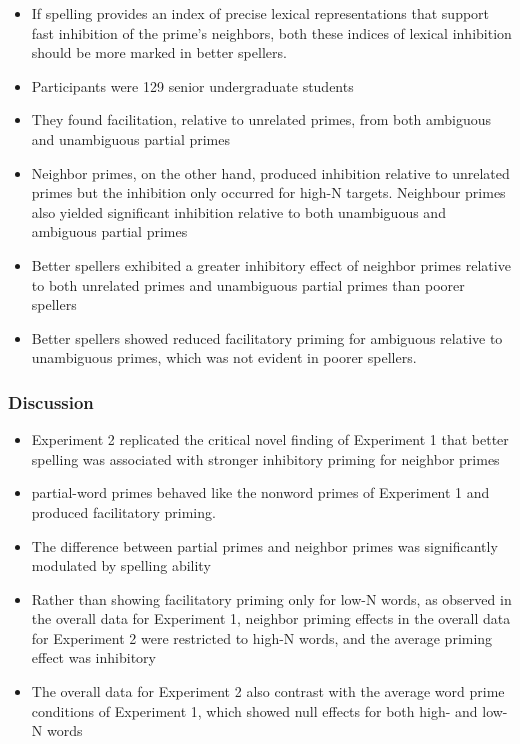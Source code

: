 \documentclass[]{article}
\begin{document}
{\begin{itemize}
			\item If spelling provides an index of precise lexical representations that support fast inhibition of the prime’s neighbors, both these indices of lexical inhibition should be more marked in better spellers.
			\item Participants were 129 senior undergraduate students 
			\item They found facilitation, relative to unrelated primes, from both ambiguous and unambiguous partial primes
			\item Neighbor primes, on the other hand, produced inhibition relative to unrelated primes but the inhibition only occurred for high-N targets.  Neighbour primes also yielded significant inhibition relative to both unambiguous and ambiguous partial primes
			\item Better spellers exhibited a greater inhibitory effect of neighbor primes relative to both unrelated primes and unambiguous partial primes than poorer spellers
			\item Better spellers showed reduced facilitatory priming for ambiguous relative to unambiguous primes, which was not evident in poorer spellers.
			
		\end{itemize}
	
			\subsubsection{Discussion}
			\begin{itemize}
				\item Experiment 2 replicated the critical novel finding of Experiment 1 that better spelling was associated with stronger inhibitory priming for neighbor primes
				\item partial-word primes behaved like the nonword primes of Experiment 1 and produced facilitatory priming.
				\item The difference between partial primes and neighbor primes was significantly modulated by spelling ability
				\item Rather than showing facilitatory priming only for low-N words, as observed in the overall data for Experiment 1, neighbor priming effects in the overall data for Experiment 2 were restricted to high-N words, and the average priming effect was inhibitory
				\item The overall data for Experiment 2 also contrast with the average word prime conditions of Experiment 1, which showed null effects for both high- and low-N words		
			\end{itemize}	
	
}
\end{document}
